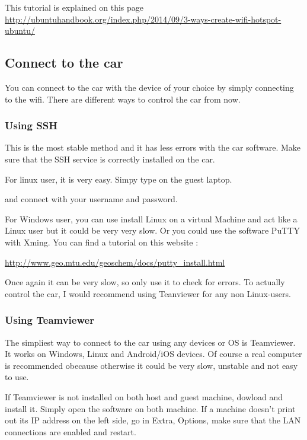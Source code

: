 This tutorial is explained on this page 
\hyperref[http://ubuntuhandbook.org/index.php/2014/09/3-ways-create-wifi-hotspot-ubuntu/]{http://ubuntuhandbook.org/index.php/2014/09/3-ways-create-wifi-hotspot-ubuntu/}



\subsection{Connect to the car}

You can connect to the car with the device of your choice by simply connecting to the wifi. There are different ways to control the car from now.

\subsubsection{Using SSH}


This is the most stable method and it has less errors with the car software. Make sure that the SSH service is correctly installed on the car.

For linux user, it is very easy. Simpy type on the guest laptop.

 and connect with your username and password.

For Windows user, you can use install Linux on a virtual Machine and act like a Linux user but it could be very very slow. Or you could use the software PuTTY with Xming. You can find a tutorial on this website :

\hyperref[http://www.geo.mtu.edu/geoschem/docs/putty_install.html]{http://www.geo.mtu.edu/geoschem/docs/putty\_install.html}

Once again it can be very slow, so only use it to check for errors. To actually control the car, I would recommend using Teanviewer for any non Linux-users.


\subsubsection{Using Teamviewer}

The simpliest way to connect to the car using any devices or OS is Teamviewer. It works on Windows, Linux and Android/iOS devices. Of course a real computer is recommended obecause otherwise it could be very slow, unstable and not easy to use.

If Teamviewer is not installed on both host and guest machine, dowload and install it. Simply open the software on both machine. If a machine doesn't print out its IP address on the left side, go in Extra, Options, make sure that the LAN connections are enabled and restart.


